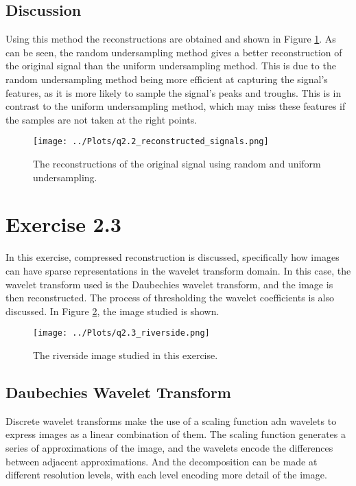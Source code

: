 \documentclass[12pt]{report} %
\begin{document}
\subsection{Discussion}

Using this method the reconstructions are obtained and shown in Figure \ref{fig:reconstructions}. As can be seen, the random undersampling method gives a better reconstruction of the original signal than the uniform undersampling method. This is due to the random undersampling method being more efficient at capturing the signal's features, as it is more likely to sample the signal's peaks and troughs. This is in contrast to the uniform undersampling method, which may miss these features if the samples are not taken at the right points.

\begin{figure}[htbp]
    \centering
    \texttt{[image: ../Plots/q2.2\_reconstructed\_signals.png]}
    \caption{The reconstructions of the original signal using random and uniform undersampling.}
    \label{fig:reconstructions}
\end{figure}


\section{Exercise 2.3}

In this exercise, compressed reconstruction is discussed, specifically how images can have sparse representations in the wavelet transform domain. In this case, the wavelet transform used is the Daubechies wavelet transform, and the image is then reconstructed. The process of thresholding the wavelet coefficients is also discussed. In Figure \ref{fig:riverside}, the image studied is shown.

\begin{figure}[htbp]
    \centering
    \texttt{[image: ../Plots/q2.3\_riverside.png]}
    \caption{The riverside image studied in this exercise.}
    \label{fig:riverside}
\end{figure}

\subsection{Daubechies Wavelet Transform}

Discrete wavelet transforms make the use of a scaling function adn wavelets to express images as a linear combination of them. The scaling function generates a series of approximations of the image, and the wavelets encode the differences between adjacent approximations. And the decomposition can be made at different resolution levels, with each level encoding more detail of the image\cite{mallat1989theory}.
\end{document}
